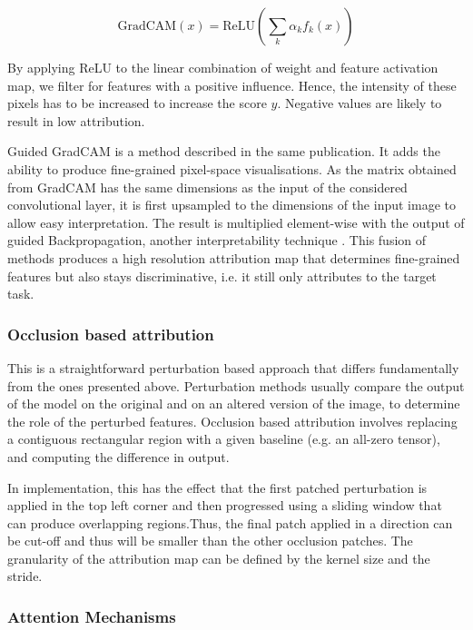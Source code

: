 \[
\text{GradCAM}(x) = \text{ReLU}\left(\sum_k \alpha_k f_k(x)\right)
\]

By applying ReLU to the linear combination of weight and feature activation map, we filter for features with a positive influence. Hence, the intensity of these pixels has to be increased to increase the score \(y\). Negative values are likely to result in low attribution. \cite{Selvaraju2016Grad}

Guided GradCAM is a method described in the same publication. It adds the ability to produce fine-grained pixel-space visualisations.
As the matrix obtained from GradCAM has the same dimensions as the input of the considered convolutional layer, it is first upsampled to the dimensions of the input image to allow easy interpretation. The result is multiplied element-wise with the output of guided Backpropagation, another interpretability technique \cite{Springenberg2014Striving}. This fusion of methods produces a high resolution attribution map that determines fine-grained features but also stays discriminative, i.e. it still only attributes to the target task. \cite{Selvaraju2016Grad}

\subsubsection{Occlusion based attribution}

This is a straightforward perturbation based approach that differs fundamentally from the ones presented above. Perturbation methods usually compare the output of the model on the original and on an altered version of the image, to determine the role of the perturbed features. Occlusion based attribution involves replacing a contiguous rectangular region with a given baseline (e.g. an all-zero tensor), and computing the difference in output. \cite{Zeiler2013Visualizing} 

In implementation, this has the effect that the first patched perturbation is applied in the top left corner and then progressed using a sliding window that can produce overlapping regions.Thus, the final patch applied in a direction can be cut-off and thus will be smaller than the  other occlusion patches. The granularity of the attribution map can be defined by the kernel size and the stride. \cite{Zeiler2013Visualizing}

\subsubsection{Attention Mechanisms}

